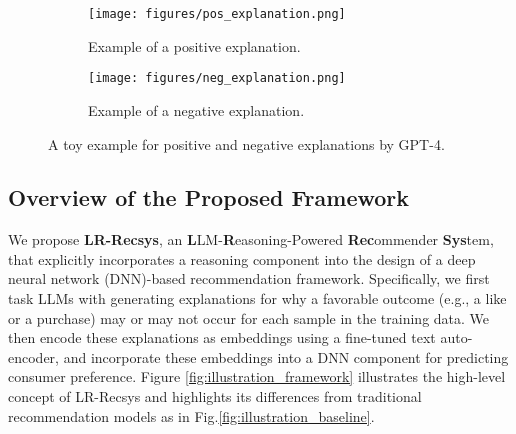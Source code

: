 \begin{figure}[hbtp!]
    \begin{subfigure}[b]{0.49\textwidth}
        \centering
        \texttt{[image: figures/pos\_explanation.png]}
        \caption{Example of a positive explanation.}
        \label{fig:pos_explanation}
    \end{subfigure}
    \hfill
     \centering
    \begin{subfigure}[b]{0.48\textwidth}
        \centering
        \texttt{[image: figures/neg\_explanation.png]}
        \caption{Example of a negative explanation.}
        \label{fig:neg_explanation}
    \end{subfigure}
    \caption{A toy example for positive and negative explanations by GPT-4.}
  \label{fig:example_explanations}
\end{figure}

\subsection{Overview of the Proposed Framework}
\label{sec:framework_overview}
We propose \textbf{LR-Recsys}, an \textbf{L}LM-\textbf{R}easoning-Powered \textbf{Rec}ommender \textbf{Sys}tem, that explicitly incorporates a reasoning component into the design of a deep neural network (DNN)-based recommendation framework. Specifically, we first task LLMs with generating explanations for why a favorable outcome (e.g., a like or a purchase) may or may not occur for each sample in the training data. We then encode these explanations as embeddings using a fine-tuned text auto-encoder, and incorporate these embeddings into a DNN component for predicting consumer preference. Figure \ref{fig:illustration_framework} illustrates the high-level concept of LR-Recsys and highlights its differences from traditional recommendation models as in Fig.\ref{fig:illustration_baseline}. %


